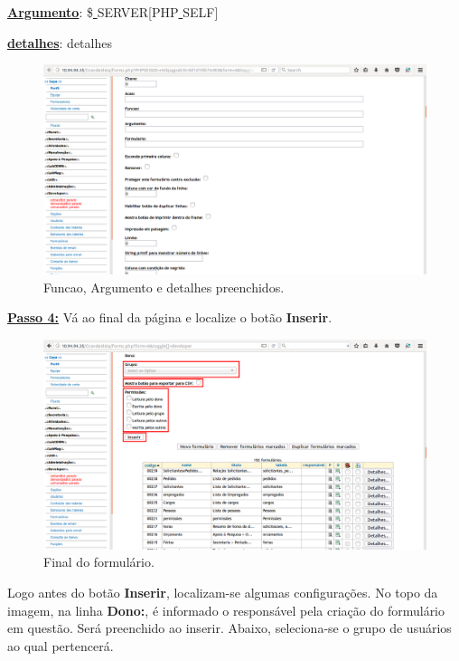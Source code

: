 \documentclass[9pt]{report}
\begin{document}
{      \underline{\textbf{Argumento}}: \$\underline{ }SERVER[PHP\underline{ }SELF]
      
      \underline{\textbf{detalhes}}: detalhes

      \begin{figure}[H]
        \includegraphics[width=\textwidth]{2_Formularios/2_Criacao_de_formularios/8.png}
        \caption{Funcao, Argumento e detalhes preenchidos.}
        \label{fig:configform2}
      \end{figure}

      \underline{\textbf{Passo 4:}} Vá ao final da página e
      localize o botão \textbf{Inserir}.

      \begin{figure}[H]
        \includegraphics[width=\textwidth]{2_Formularios/2_Criacao_de_formularios/9.png}
        \caption{Final do formulário.}
        \label{fig:finalform}
      \end{figure}

      Logo antes do botão \textbf{Inserir}, localizam-se algumas
      configurações. No topo da imagem, na linha \textbf{Dono:}, é
      informado o responsável pela criação do formulário em questão.
      Será preenchido ao inserir. Abaixo, seleciona-se o grupo de
      usuários ao qual pertencerá.

}
\end{document}
